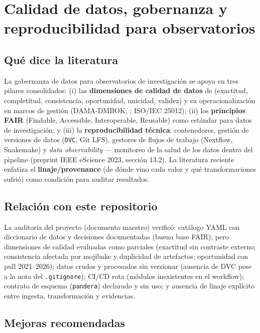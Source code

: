 \section{Calidad de datos, gobernanza y reproducibilidad para observatorios}

\subsection{Qué dice la literatura}

La gobernanza de datos para observatorios de investigación se apoya en tres
pilares consolidados: (i) las \textbf{dimensiones de calidad de datos} de
\citet{wang1996beyond} (exactitud, completitud, consistencia, oportunidad,
unicidad, validez) y su operacionalización en marcos de gestión (DAMA-DMBOK,
\citet{dama2017dmbok}; ISO/IEC 25012); (ii) los \textbf{principios FAIR}
\citep{wilkinson2016fair} (Findable, Accessible, Interoperable, Reusable) como
estándar para datos de investigación; y (iii) la \textbf{reproducibilidad
técnica}: contenedores, gestión de versiones de datos (\texttt{DVC}, Git LFS),
gestores de flujos de trabajo (Nextflow, Snakemake) y \emph{data observability}
— monitoreo de la salud de los datos dentro del pipeline
\citep{souza2023observability} (preprint IEEE eScience 2023, sección 13.2). La
literatura reciente enfatiza el \textbf{linaje/provenance} (de dónde vino cada
valor y qué transformaciones sufrió) como condición para auditar resultados.

\subsection{Relación con este repositorio}

La auditoría del proyecto (documento maestro) verificó: catálogo YAML con
diccionario de datos y decisiones documentadas (buena base FAIR); pero
dimensiones de calidad evaluadas como parciales (exactitud sin contraste
externo; consistencia afectada por mojibake y duplicidad de artefactos;
oportunidad con pull 2021--2026); datos crudos y procesados sin versionar
(ausencia de DVC pese a la nota del \texttt{.gitignore}); CI/CD rota
(módulos inexistentes en el workflow); contrato de esquema (\texttt{pandera})
declarado y sin uso; y ausencia de linaje explícito entre ingesta,
transformación y evidencias.

\subsection{Mejoras recomendadas}


